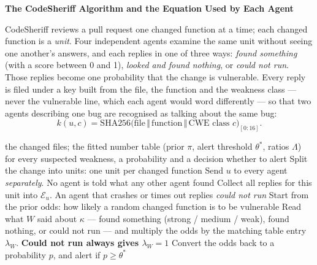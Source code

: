 \documentclass[9pt,journal,onecolumn]{IEEEtran}
\newcommand{\LR}{\Lambda}
\begin{document}
\begin{center}
\textbf{\large The CodeSheriff Algorithm and the Equation Used by Each Agent}
\end{center}

\noindent
CodeSheriff reviews a pull request one changed function at a time; each changed function is a
\emph{unit}. Four independent agents examine the same unit without seeing one another's answers, and
each replies in one of three ways: \emph{found something} (with a score between 0 and 1), \emph{looked
and found nothing}, or \emph{could not run}. Those replies become one probability that the change is
vulnerable. Every reply is filed under a key built from the file, the function and the weakness class
--- never the vulnerable line, which each agent would word differently --- so that two agents
describing one bug are recognised as talking about the same bug:
\begin{equation}
k(u,c)=\mathrm{SHA256}\bigl(\text{file}\,\Vert\,\text{function}\,\Vert\,\text{CWE class }c\bigr)_{[0:16]} .
\end{equation}

\begin{algorithm}[H]
\caption{\textsc{CodeSheriff} --- reviewing one pull request}
\begin{algorithmic}[1]
\Require the changed files; the fitted number table (prior $\pi$, alert threshold $\theta^{*}$, ratios $\LR$)
\Ensure for every suspected weakness, a probability and a decision whether to alert
\State Split the change into units: one unit per changed function
  \State Send $u$ to every agent \emph{separately}. No agent is told what any other agent found
  \State Collect all replies for this unit into $\mathcal{E}_u$. An agent that crashes or times out replies \emph{could not run}
    \State Start from the prior odds: how likely a random changed function is to be vulnerable
      \State Read what $W$ said about $\kappa$ --- found something (strong / medium / weak), found nothing, or could not run --- and multiply the odds by the matching table entry $\lambda_W$. \textbf{Could not run always gives $\lambda_W=1$}
    \EndFor
    \State Convert the odds back to a probability $p$, and alert if $p \ge \theta^{*}$
  \EndFor
\EndFor
\end{algorithmic}
\end{algorithm}
\end{document}
